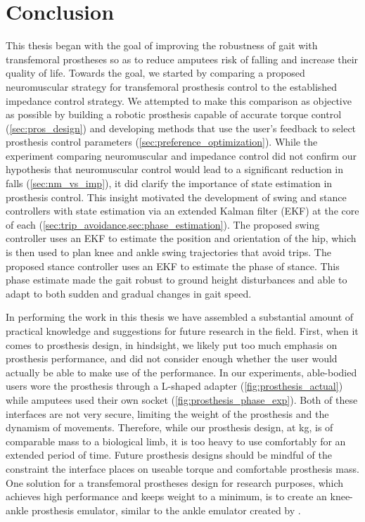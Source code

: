 \chapter{Conclusion}\label{sec:thesis_conclusion}

This thesis began with the goal of improving the robustness of gait with
transfemoral prostheses so as to reduce amputees risk of falling and increase
their quality of life. Towards the goal, we started by comparing a proposed
neuromuscular strategy for transfemoral prosthesis control to the established
impedance control strategy. We attempted to make this comparison as objective as
possible by building a robotic prosthesis capable of accurate torque control
(\cref{sec:pros_design}) and developing methods that use the user's feedback to
select prosthesis control parameters (\cref{sec:preference_optimization}). While
the experiment comparing neuromuscular and impedance control did not confirm our
hypothesis that neuromuscular control would lead to a significant reduction in
falls (\cref{sec:nm_vs_imp}), it did clarify the importance of state estimation
in prosthesis control. This insight motivated the development of swing and
stance controllers with state estimation via an extended Kalman filter (EKF) at
the core of each (\cref{sec:trip_avoidance,sec:phase_estimation}). The proposed
swing controller uses an EKF to estimate the position and orientation of the
hip, which is then used to plan knee and ankle swing trajectories that avoid
trips. The proposed stance controller uses an EKF to estimate the phase of
stance. This phase estimate made the gait robust to ground height disturbances
and able to adapt to both sudden and gradual changes in gait speed. 

In performing the work in this thesis we have assembled a substantial amount of
practical knowledge and suggestions for future research in the field. First,
when it comes to prosthesis design, in hindsight, we likely put too much
emphasis on prosthesis performance, and did not consider enough whether the user
would actually be able to make use of the performance. In our experiments,
able-bodied users wore the prosthesis through a L-shaped adapter
(\cref{fig:prosthesis_actual}) while amputees used their own socket
(\cref{fig:prosthesis_phase_exp}). Both of these interfaces are not very secure,
limiting the weight of the prosthesis and the dynamism of movements. Therefore,
while our prosthesis design, at \unit[6]{kg}, is of comparable mass to a
biological limb, it is too heavy to use comfortably for an extended period of
time. Future prosthesis designs should be mindful of the constraint the
interface places on useable torque and comfortable prosthesis mass. One solution
for a transfemoral prostheses design for research purposes, which achieves high
performance and keeps weight to a minimum, is to create an knee-ankle prosthesis
emulator, similar to the ankle emulator created by
\citet{caputo2013experimental}.

